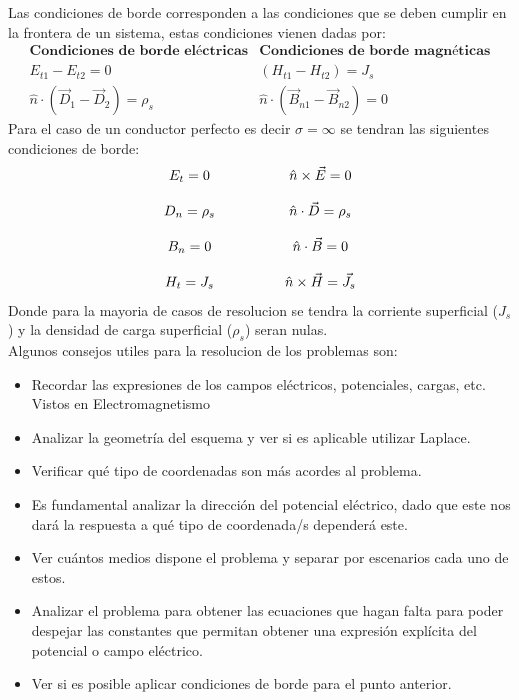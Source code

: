 \documentclass[
  11pt,
  letterpaper,
   addpoints,
   answers
  ]{exam}
\begin{document}
Las condiciones de borde corresponden a las condiciones que se deben cumplir en la frontera de un sistema, estas condiciones vienen dadas por:
\begin{equation}
    \begin{array}{c|c}
    \textbf{Condiciones de borde eléctricas} & \textbf{Condiciones de borde magnéticas} \\[8pt]
    E_{t1} - E_{t2} = 0 & (H_{t1} - H_{t2}) = J_s \\[10pt]
    \hat{n} \cdot (\vec{D}_1 - \vec{D}_2) = \rho_s & \hat{n} \cdot (\vec{B}_{n1} - \vec{B}_{n2}) = 0
    \end{array}
\end{equation}
Para el caso de un conductor perfecto es decir $\sigma = \infty$ se tendran las siguientes condiciones de borde:
\begin{equation}
    \begin{array}{c c}
        E_t = 0 \quad\quad\quad\quad & \hat{n} \times \vec{E} = 0 \\[12pt]
        D_n = \rho_s \quad\quad\quad\quad & \hat{n} \cdot \vec{D} = \rho_s \\[12pt]
        B_n = 0 \quad\quad\quad\quad & \hat{n} \cdot \vec{B} = 0 \\[12pt]
        H_t = J_s \quad\quad\quad\quad & \hat{n} \times \vec{H} = \vec{J}_s
    \end{array}
\end{equation}
Donde para la mayoria de casos de resolucion se tendra la corriente superficial ($J_s$) y la densidad de carga superficial ($\rho_s$) seran nulas.\\

Algunos consejos utiles para la resolucion de los problemas son:
\begin{itemize}
    \item Recordar las expresiones de los campos eléctricos, potenciales, cargas, etc. Vistos en Electromagnetismo
    \item Analizar la geometría del esquema y ver si es aplicable utilizar Laplace.
    \item Verificar qué tipo de coordenadas son más acordes al problema.
    \item Es fundamental analizar la dirección del potencial eléctrico, dado que este nos dará la respuesta a qué tipo de coordenada/s dependerá este.
    \item Ver cuántos medios dispone el problema y separar por escenarios cada uno de estos.
    \item Analizar el problema para obtener las ecuaciones que hagan falta para poder despejar las constantes que permitan obtener una expresión explícita del potencial o campo eléctrico.
    \item Ver si es posible aplicar condiciones de borde para el punto anterior.
\end{itemize}
\newpage
\end{document}
